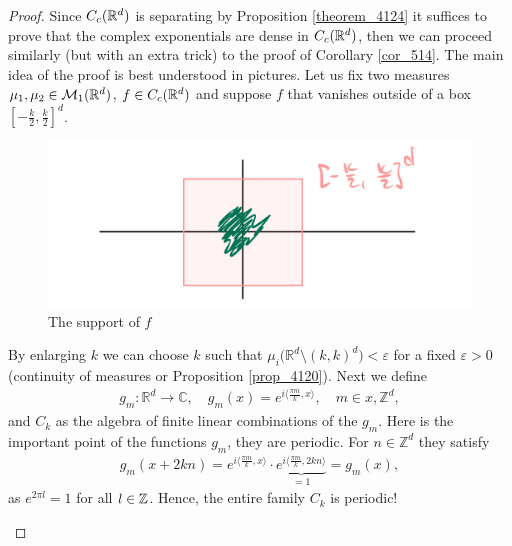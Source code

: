 \begin{proof}[Proof]
	Since $C_c(\mathbb{R}^d)$ is separating by Proposition \ref{theorem_4124} it suffices to prove that the complex exponentials are dense in $C_c(\mathbb{R}^d)$, then we can proceed similarly (but with an extra trick) to the proof of Corollary \ref{cor_514}. The main idea of the proof is best understood in pictures. Let us fix two measures $\mu_1, \mu_2\in \mathcal{M}_1(\mathbb{R}^d)$, $f\in C_c(\mathbb{R}^d)$ and suppose $f$ that vanishes outside of a box $[-\frac{k}{2}, \frac{k}{2} ]^d$. 
	\begin{figure}[h]
		\vspace{-3mm}
		\begin{center}
			\includegraphics[scale=0.07]{compact.jpeg}
		\end{center}
		\vspace{-3mm}
		\caption*{The support of $f$}
		\end{figure}
	By enlarging $k$ we can choose $k$ such that $\mu_i \big( \mathbb{R}^d  \setminus (k,k)^d \big) < \varepsilon$ for a fixed $\varepsilon >0$ (continuity of measures or Proposition \ref{prop_4120}). Next we define
	\begin{align*}
		g_m \colon \mathbb{R}^d \to \mathbb{C},\quad g_m (x) = e^{ i \langle \frac{\pi m}{k}, x \rangle },\quad m \in x,\mathbb{Z}^d,
	\end{align*}
	and $C_k$ as the algebra of finite linear combinations of the $g_m$. Here is the important point of the functions $g_m$, they are periodic. For $n \in \mathbb{Z}^d$ they satisfy
			\begin{align*}
				g_m(x+2 k n) = e^{ i \langle \frac{\pi m}{k}, x \rangle } \cdot \underbrace{e^{ i \langle \frac{\pi m}{k}, 2k n \rangle }}_{=1} = g_m(x),
			\end{align*}
			as $e^{2\pi l}=1$ for all $l\in\mathbb{Z}$.	Hence, the entire family $C_k$ is periodic!
			\begin{figure}[h]
				\vspace{-1mm}
				\begin{center}

\end{center}
\end{figure}
\end{proof}
